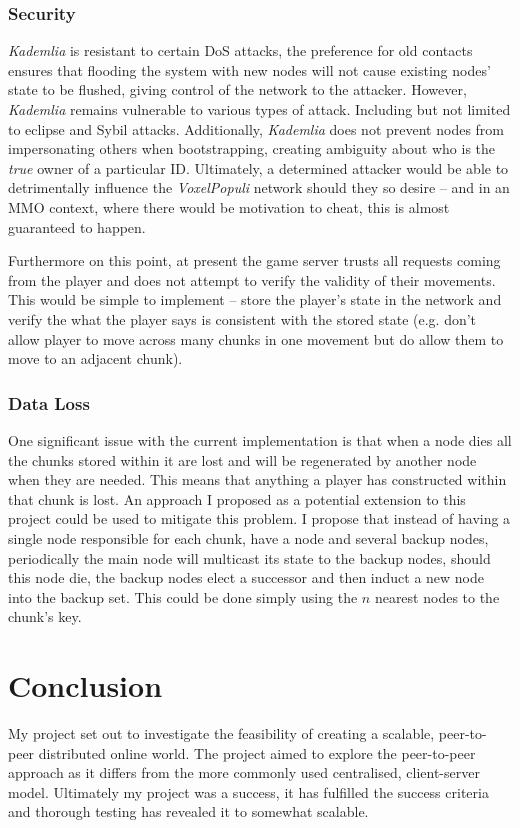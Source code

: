 \documentclass[12pt,notitlepage,a4paper]{report}
\newcommand{\kademlia}{\emph{Kademlia}}
\newcommand{\voxpop}{\emph{VoxelPopuli}}
\begin{document}
	\subsection{Security}
	\label{sec:security}
	\kademlia{} is resistant to certain DoS attacks, the preference for old contacts ensures that flooding the system with new nodes will not cause existing nodes' state to be flushed, giving control of the network to the attacker. However, \kademlia{} remains vulnerable to various types of attack. Including but not limited to eclipse and Sybil attacks. Additionally, \kademlia{} does not prevent nodes from impersonating others when bootstrapping, creating ambiguity about who is the \emph{true} owner of a particular ID. Ultimately, a determined attacker would be able to detrimentally influence the \voxpop{} network should they so desire -- and in an MMO context, where there would be motivation to cheat, this is almost guaranteed to happen.
	
	Furthermore on this point, at present the game server trusts all requests coming from the player and does not attempt to verify the validity of their movements. This would be simple to implement -- store the player's state in the network and verify the what the player says is consistent with the stored state (e.g. don't allow player to move across many chunks in one movement but do allow them to move to an adjacent chunk).
	
	\subsection{Data Loss}
	One significant issue with the current implementation is that when a node dies all the chunks stored within it are lost and will be regenerated by another node when they are needed. This means that anything a player has constructed within that chunk is lost. An approach I proposed as a potential extension to this project could be used to mitigate this problem. I propose that instead of having a single node responsible for each chunk, have a node and several backup nodes, periodically the main node will multicast its state to the backup nodes, should this node die, the backup nodes elect a successor and then induct a new node into the backup set. This could be done simply using the $n$ nearest nodes to the chunk's key.
	
	\clearpage
	\chapter{Conclusion}
	My project set out to investigate the feasibility of creating a scalable, peer-to-peer distributed online world. The project aimed to explore the peer-to-peer approach as it differs from the more commonly used centralised, client-server model. Ultimately my project was a success, it has fulfilled the success criteria and thorough testing has revealed it to somewhat scalable.
	
\end{document}
